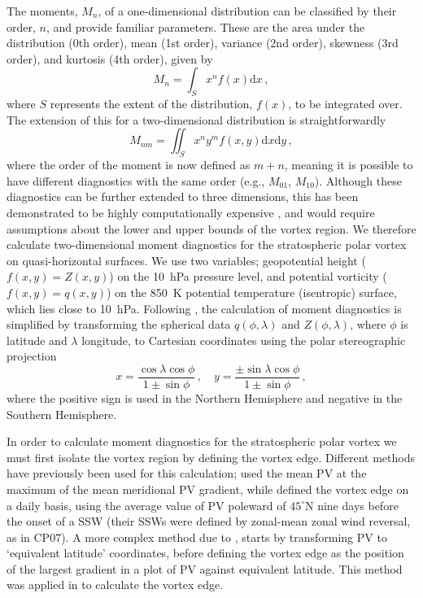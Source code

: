 The moments, $M_{n}$, of a one-dimensional distribution can be classified by
their order, $n$, and provide familiar parameters. These are the area under the
distribution (0th order), mean (1st order), variance (2nd order), skewness (3rd
order), and kurtosis (4th order), given by
\begin{equation}
M_{n} = \int_{S} x^{n}f(x)\mathrm{d}x \, ,
\end{equation}
where $S$ represents the extent of the distribution, $f(x)$, to be integrated
over. The extension of this for a two-dimensional distribution is
straightforwardly
\begin{equation}
M_{nm} = \iint_{S} x^{n}y^{m}f(x,y)\mathrm{d}x\mathrm{d}y \, ,
\label{eq:2D_moment}
\end{equation}
where the order of the moment is now defined as $m+n$, meaning it is possible to
have different diagnostics with the same order (e.g., $M_{01}$,
$M_{10}$). Although these diagnostics can be further extended to three
dimensions, this has been demonstrated to be highly computationally expensive
\citep{Li1994}, and would require assumptions about the lower and upper bounds
of the vortex region. We therefore calculate two-dimensional moment diagnostics
for the stratospheric polar vortex on quasi-horizontal surfaces. We use two
variables; geopotential height ($f(x,y) = Z(x,y)$) on the 10~hPa pressure level,
and potential vorticity ($f(x,y) = q(x,y)$) on the 850~K potential temperature
(isentropic) surface, which lies close to 10~hPa. Following \citet{Waugh1997},
the calculation of moment diagnostics is simplified by transforming the
spherical data $q(\phi,\lambda)$ and $Z(\phi,\lambda)$, where $\phi$ is latitude
and $\lambda$ longitude, to Cartesian coordinates using the polar stereographic
projection
\begin{equation}
x = \frac{\cos\lambda\cos\phi}{1 \pm \sin\phi}\, , \quad
y = \frac{\pm\sin\lambda\cos\phi}{1 \pm \sin\phi}\, , 
\end{equation}  
where the positive sign is used in the Northern Hemisphere and negative in the
Southern Hemisphere.

In order to calculate moment diagnostics for the stratospheric polar vortex we
must first isolate the vortex region by defining the vortex edge. Different
methods have previously been used for this calculation; \citet{Waugh1999} used
the mean PV at the maximum of the mean meridional PV gradient, while
\citet{Matthewman2009} defined the vortex edge on a daily basis, using the
average value of PV poleward of $45^{\circ}$N nine days before the onset of a
SSW (their SSWs were defined by zonal-mean zonal wind reversal, as in CP07). A
more complex method due to \citet{Nash1996}, starts by transforming PV to
`equivalent latitude' \citep{Butchart1986} coordinates, before defining the
vortex edge as the position of the largest gradient in a plot of PV against
equivalent latitude. This method was applied in \citet{Mitchell2011} to
calculate the vortex edge. 

